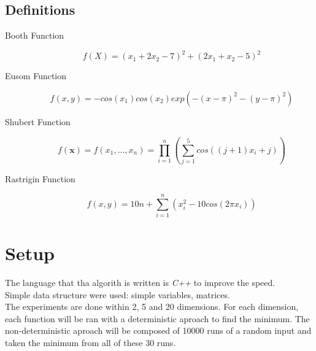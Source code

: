 \documentclass{article}
\begin{document}
\subsection{Definitions}
\label{definitions}
\begin{description}
\item[Booth Function]

\begin{equation}
f(X)=\left(x_1+2x_2-7\right)^2+\left(2x_1+x_2-5\right)^2
\end{equation}

\item[Eusom Function]

\begin{equation}
f(x,y)=−cos(x_1)cos(x_2) exp(−(x − \pi)^2−(y − \pi)^2)
\end{equation}

\item[Shubert Function]

\begin{equation}
f(\mathbf{x})=f(x_1, ...,x_n)=\prod_{i=1}^{n}{\left(\sum_{j=1}^5{ cos((j+1)x_i+j)}\right)}
\end{equation}

\item[Rastrigin Function]

\begin{equation}
f(x, y)=10n + \sum_{i=1}^{n}(x_i^2 - 10cos(2\pi x_i))
\end{equation}

\end{description} 
 

\section{Setup}

The language that tha algorith is written is \emph{C++} to improve the speed.\\
Simple data structure were used: simple variables, matrices.\\

The experiments are done within 2, 5 and 20 dimensions. 
For each dimension, each function will be ran with a deterministic aproach to find the minimum.
The non-deterministic aproach will be composed of 10000 runs of a random input and taken the minimum from all of these 30 runs.\\
\end{document}
